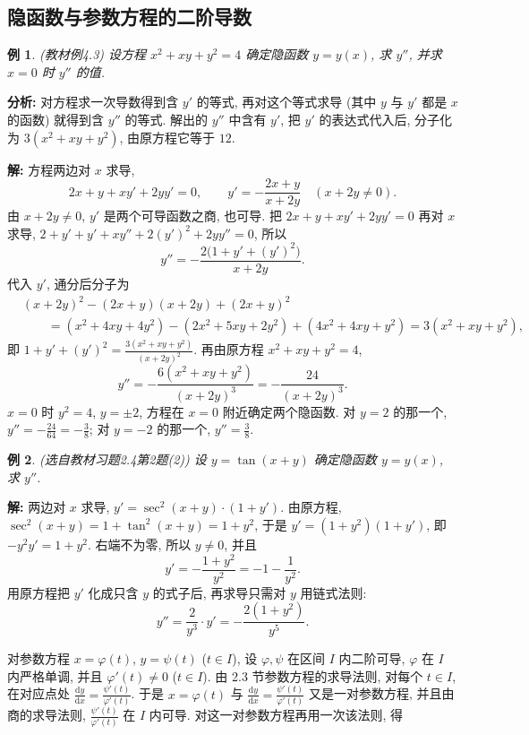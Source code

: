 \documentclass[UTF8,openany]{ctexbook}
\theoremstyle{chinesetextbook}
\newtheorem{example}{例}[section]
\newenvironment{cnsolution}{\par\indent\textbf{解:} \ignorespaces}{\par}
\newcommand{\dd}{\mathrm d}
\begin{document}
\subsection{隐函数与参数方程的二阶导数}
\begin{example}\label{ex:c2-4-3}
\textnormal{(教材例4.3)} 设方程 $x^2+xy+y^2=4$ 确定隐函数 $y=y(x)$, 求 $y''$, 并求 $x=0$ 时 $y''$ 的值.
\end{example}
\par\indent\textbf{分析:} 对方程求一次导数得到含 $y'$ 的等式, 再对这个等式求导 (其中 $y$ 与 $y'$ 都是 $x$ 的函数) 就得到含 $y''$ 的等式. 解出的 $y''$ 中含有 $y'$, 把 $y'$ 的表达式代入后, 分子化为 $3(x^2+xy+y^2)$, 由原方程它等于 $12$.
\begin{cnsolution}
方程两边对 $x$ 求导,
\[
2x+y+xy'+2yy'=0,\qquad y'=-\frac{2x+y}{x+2y}\quad(x+2y\ne0).
\]
由 $x+2y\ne0$, $y'$ 是两个可导函数之商, 也可导. 把 $2x+y+xy'+2yy'=0$ 再对 $x$ 求导, $2+y'+y'+xy''+2(y')^2+2yy''=0$, 所以
\[
y''=-\frac{2\bigl(1+y'+(y')^2\bigr)}{x+2y}.
\]
代入 $y'$, 通分后分子为
\[
\begin{aligned}
&(x+2y)^2-(2x+y)(x+2y)+(2x+y)^2\\
&\qquad=(x^2+4xy+4y^2)-(2x^2+5xy+2y^2)+(4x^2+4xy+y^2)=3(x^2+xy+y^2),
\end{aligned}
\]
即 $\displaystyle1+y'+(y')^2=\frac{3(x^2+xy+y^2)}{(x+2y)^2}$. 再由原方程 $x^2+xy+y^2=4$,
\[
y''=-\frac{6(x^2+xy+y^2)}{(x+2y)^3}=-\frac{24}{(x+2y)^3}.
\]
$x=0$ 时 $y^2=4$, $y=\pm2$, 方程在 $x=0$ 附近确定两个隐函数. 对 $y=2$ 的那一个, $\displaystyle y''=-\frac{24}{64}=-\frac38$; 对 $y=-2$ 的那一个, $\displaystyle y''=\frac38$.
\end{cnsolution}
\begin{example}\label{ex:c2-h4-2}
\textnormal{(选自教材习题2.4第2题(2))} 设 $y=\tan(x+y)$ 确定隐函数 $y=y(x)$, 求 $y''$.
\end{example}
\begin{cnsolution}
两边对 $x$ 求导, $y'=\sec^2(x+y)\cdot(1+y')$. 由原方程, $\sec^2(x+y)=1+\tan^2(x+y)=1+y^2$, 于是 $y'=(1+y^2)(1+y')$, 即 $-y^2y'=1+y^2$. 右端不为零, 所以 $y\ne0$, 并且
\[
y'=-\frac{1+y^2}{y^2}=-1-\frac1{y^2}.
\]
用原方程把 $y'$ 化成只含 $y$ 的式子后, 再求导只需对 $y$ 用链式法则:
\[
y''=\frac2{y^3}\cdot y'=-\frac{2(1+y^2)}{y^5}.
\]
\end{cnsolution}
对参数方程 $x=\varphi(t)$, $y=\psi(t)$ ($t\in I$), 设 $\varphi,\psi$ 在区间 $I$ 内二阶可导, $\varphi$ 在 $I$ 内严格单调, 并且 $\varphi'(t)\ne0$ ($t\in I$). 由 2.3 节参数方程的求导法则, 对每个 $t\in I$, 在对应点处 $\displaystyle\frac{\dd y}{\dd x}=\frac{\psi'(t)}{\varphi'(t)}$. 于是 $x=\varphi(t)$ 与 $\displaystyle\frac{\dd y}{\dd x}=\frac{\psi'(t)}{\varphi'(t)}$ 又是一对参数方程, 并且由商的求导法则, $\displaystyle\frac{\psi'(t)}{\varphi'(t)}$ 在 $I$ 内可导. 对这一对参数方程再用一次该法则, 得
\end{document}
